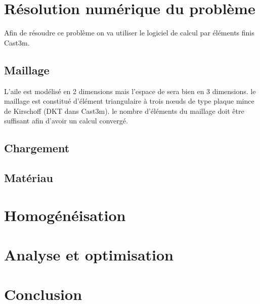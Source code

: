 \documentclass[12pt,a4paper]{article}
\begin{document}
\section{Résolution numérique du problème}
Afin de résoudre ce problème on va utiliser le logiciel de calcul par éléments finis Cast3m.
\subsection{Maillage}
L'aile est modélisé en 2 dimensions mais l'espace de sera bien en 3 dimensions. le maillage est constitué d'élément triangulaire à trois nœuds de type plaque mince de Kirschoff (DKT dans Cast3m). le nombre d'éléments du maillage doit être suffisant afin d'avoir un calcul convergé.
\subsection{Chargement}
\subsection{Matériau}
\section{Homogénéisation}
\section{Analyse et optimisation}
\section{Conclusion}
\end{document}
